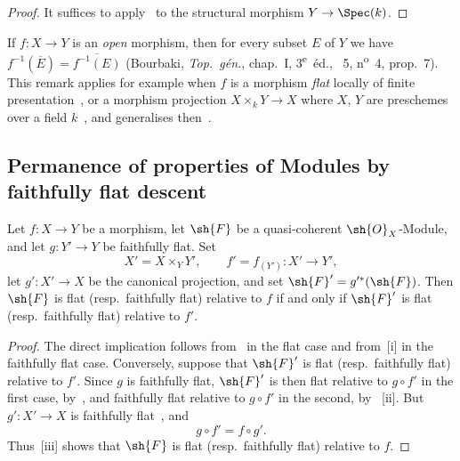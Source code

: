 \begin{proof}
It suffices to apply~ to the structural morphism $Y\to\Spec(k)$.
\end{proof}

\begin{remark}[2.4.11]
\label{IV.2.4.11}
If $f:X\to Y$ is an \emph{open} morphism, then for every subset $E$ of $Y$ we have $f^{-1}(\overline{E})=\overline{f^{-1}(E)}$ (Bourbaki, \emph{Top.~g\'{e}n.}, chap.~I, 3\textsuperscript{e}~\'{e}d., \textsection~5, n\textsuperscript{o}~4, prop.~7).
This remark applies for example when $f$ is a morphism \emph{flat} locally of finite presentation~, or a morphism projection $X\times_k Y\to X$ where $X$, $Y$ are preschemes over a field $k$~, and generalises then~.
\end{remark}

\subsection{Permanence of properties of Modules by faithfully flat descent}
\label{subsection:IV.2.5}

\begin{proposition}[2.5.1]
\label{IV.2.5.1}
Let $f:X\to Y$ be a morphism, let $\sh{F}$ be a quasi-coherent
$\sh{O}_X$-Module, and let $g:Y'\to Y$ be faithfully flat. Set
\[
  X'=X\times_Y Y',\qquad
  f'=f_{(Y')}:X'\to Y',
\]
let $g':X'\to X$ be the canonical projection, and set
$\sh{F}'=g'^*(\sh{F})$. Then $\sh{F}$ is flat \textnormal{(}resp.\
faithfully flat\textnormal{)} relative to $f$ if and only if $\sh{F}'$ is
flat \textnormal{(}resp.\ faithfully flat\textnormal{)} relative to $f'$.
\end{proposition}

\begin{proof}
The direct implication follows from~ in the flat case and
from~\sref{IV.2.2.11}[i] in the faithfully flat case. Conversely, suppose
that $\sh{F}'$ is flat \textnormal{(}resp.\ faithfully flat\textnormal{)}
relative to $f'$. Since $g$ is faithfully flat, $\sh{F}'$ is then flat
relative to $g\circ f'$ in the first case, by~\sref{IV.2.1.6}, and
faithfully flat relative to $g\circ f'$ in the second, by
~[ii]. But $g':X'\to X$ is faithfully
flat~, and
\[
  g\circ f'=f\circ g'.
\]
Thus~[iii] shows that $\sh{F}$ is flat
\textnormal{(}resp.\ faithfully flat\textnormal{)} relative to $f$.
\end{proof}


